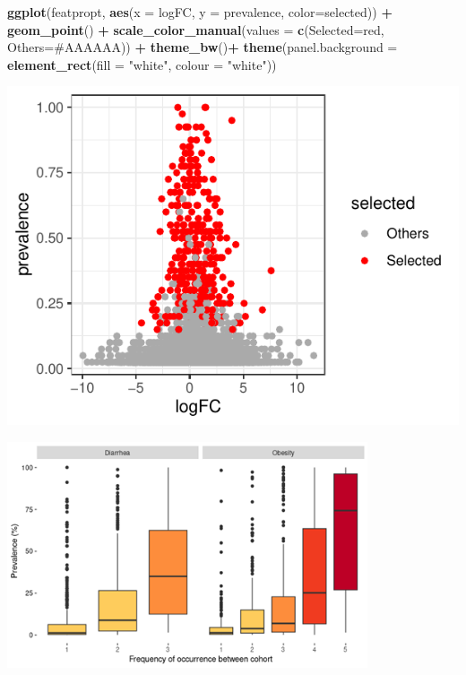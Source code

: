 \documentclass[
]{article}
\newenvironment{Shaded}{\begin{snugshade}}{\end{snugshade}}
\newcommand{\AttributeTok}[1]{\textcolor[rgb]{0.13,0.29,0.53}{#1}}
\newcommand{\FunctionTok}[1]{\textcolor[rgb]{0.13,0.29,0.53}{\textbf{#1}}}
\newcommand{\NormalTok}[1]{#1}
\newcommand{\OtherTok}[1]{\textcolor[rgb]{0.56,0.35,0.01}{#1}}
\newcommand{\SpecialCharTok}[1]{\textcolor[rgb]{0.81,0.36,0.00}{\textbf{#1}}}
\newcommand{\StringTok}[1]{\textcolor[rgb]{0.31,0.60,0.02}{#1}}
\begin{document}
\begin{Shaded}
\begin{Highlighting}[]

\FunctionTok{ggplot}\NormalTok{(featpropt, }\FunctionTok{aes}\NormalTok{(}\AttributeTok{x =}\NormalTok{ logFC, }\AttributeTok{y =}\NormalTok{ prevalence, }\AttributeTok{color=}\NormalTok{selected)) }\SpecialCharTok{+} \FunctionTok{geom\_point}\NormalTok{() }\SpecialCharTok{+}
  \FunctionTok{scale\_color\_manual}\NormalTok{(}\AttributeTok{values =} \FunctionTok{c}\NormalTok{(}\StringTok{\textquotesingle{}Selected\textquotesingle{}}\OtherTok{=}\StringTok{\textquotesingle{}red\textquotesingle{}}\NormalTok{, }\StringTok{\textquotesingle{}Others\textquotesingle{}}\OtherTok{=}\StringTok{\textquotesingle{}\#AAAAAA\textquotesingle{}}\NormalTok{)) }\SpecialCharTok{+} 
  \FunctionTok{theme\_bw}\NormalTok{()}\SpecialCharTok{+} \FunctionTok{theme}\NormalTok{(}\AttributeTok{panel.background =} \FunctionTok{element\_rect}\NormalTok{(}\AttributeTok{fill =} \StringTok{"white"}\NormalTok{, }\AttributeTok{colour =} \StringTok{"white"}\NormalTok{))}
\end{Highlighting}
\end{Shaded}

\includegraphics{workshop_files/figure-latex/unnamed-chunk-49-2.pdf}

\includegraphics[width=0.8\textwidth,height=\textheight]{images/Fig19.png}
\end{document}

